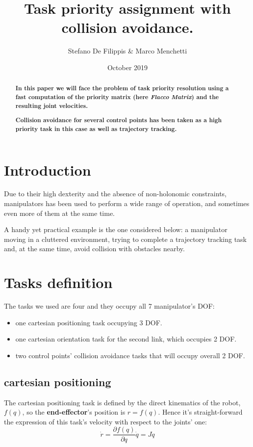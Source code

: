 \documentclass[12pt,a4paper, twocolumn, twoside]{article}
\newcommand{\diff}[2]{\frac{\partial{#1}}{\partial{#2}}}
\begin{document}
	
	\title{Task priority assignment with collision avoidance.}
	\author{Stefano De Filippis \& Marco Menchetti}
	\date{October 2019}
	\maketitle
	
\begin{abstract}
	\textbf{
	In this paper we will face the problem of task priority resolution using a fast computation of the priority matrix (here \textit{Flacco Matrix}) and the resulting joint velocities.}

\textbf{
	Collision avoidance for several control points has been taken as a high priority task in this case as well as trajectory tracking.}
\end{abstract}
\section*{Introduction}
Due to their high dexterity and the absence of non-holonomic constraints, manipulators has been used to perform a wide range of operation, and sometimes even more of them at the same time.

A handy yet practical example is the one considered below: a manipulator moving in a cluttered environment, trying to complete a trajectory tracking task and, at the same time, avoid collision with obstacles nearby.

\section{Tasks definition}
The tasks we used are four and they occupy all 7 manipulator's DOF:
\begin{itemize}
	\item one cartesian positioning task occupying 3 DOF.
	\item one cartesian orientation task for the second link, which occupies 2 DOF.
	\item two control points' collision avoidance tasks that will occupy overall 2 DOF.
\end{itemize}
\subsection[Task 1]{cartesian positioning}
The cartesian positioning task is defined by the direct kinematics of the robot, $f(q)$, so the \textbf{end-effector}'s position is $r = f(q)$. Hence it's straight-forward the expression of this task's velocity with respect to the joints' one: 
\begin{equation}
\label{EQN: task1}
 \dot{r} = \diff{f(q)}{q} \dot{q} = J\dot{q}
\end{equation}
\end{document}
